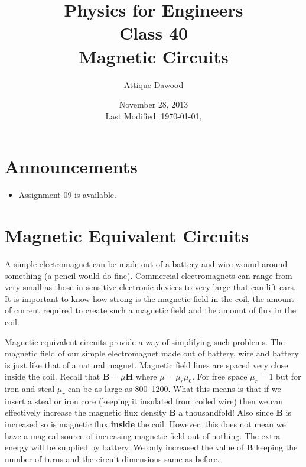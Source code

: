 \documentclass[12pt,a4paper]{article}
\title{\vspace{-3cm}Physics for Engineers\\Class 40\\Magnetic Circuits}
\author{Attique Dawood}
\date{November 28, 2013\\[0.2cm] Last Modified: \today, \currenttime}
\begin{document}
\maketitle
\section{Announcements}
\begin{itemize}
\item Assignment 09 is available.
\end{itemize}
\section{Magnetic Equivalent Circuits}
A simple electromagnet can be made out of a battery and wire wound around something (a pencil would do fine). Commercial electromagnets can range from very small as those in sensitive electronic devices to very large that can lift cars. It is important to know how strong is the magnetic field in the coil, the amount of current required to create such a magnetic field and the amount of flux in the coil.

Magnetic equivalent circuits provide a way of simplifying such problems. The magnetic field of our simple electromagnet made out of battery, wire and battery is just like that of a natural magnet. Magnetic field lines are spaced very close inside the coil. Recall that $\textbf{B}=\mu\textbf{H}$ where $\mu=\mu_r\mu_0$. For free space $\mu_r=1$ but for iron and steal $\mu_r$ can be as large as 800--1200. What this means is that if we insert a steal or iron core (keeping it insulated from coiled wire) then we can effectively increase the magnetic flux density \textbf{B} a thousandfold! Also since \textbf{B} is increased so is magnetic flux \textbf{inside} the coil. However, this does not mean we have a magical source of increasing magnetic field out of nothing. The extra energy will be supplied by battery. We only increased the value of \textbf{B} keeping the number of turns and the circuit dimensions same as before.
\end{document}
